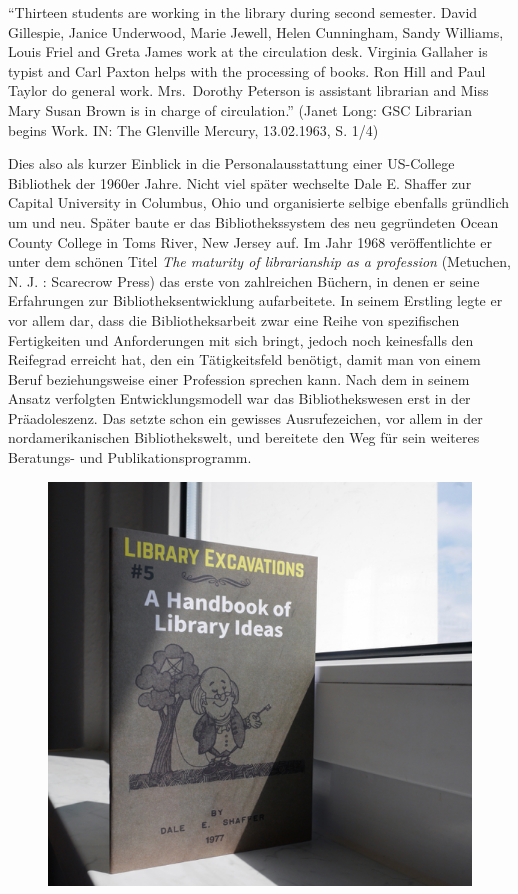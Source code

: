 \documentclass[a4paper,
fontsize=11pt,
oneside,
numbers=noperiodatend,
parskip=half-,
bibliography=totoc,
final
]{scrartcl}
\begin{document}
\enquote{Thirteen students are working in the library during second
semester. David Gillespie, Janice Underwood, Marie Jewell, Helen
Cunningham, Sandy Williams, Louis Friel and Greta James work at the
circulation desk. Virginia Gallaher is typist and Carl Paxton helps with
the processing of books. Ron Hill and Paul Taylor do general work.
Mrs.~Dorothy Peterson is assistant librarian and Miss Mary Susan Brown
is in charge of circulation.} (Janet Long: GSC Librarian begins Work.
IN: The Glenville Mercury, 13.02.1963, S. 1/4)

Dies also als kurzer Einblick in die Personalausstattung einer
US-College Bibliothek der 1960er Jahre. Nicht viel später wechselte Dale
E. Shaffer zur Capital University in Columbus, Ohio und organisierte
selbige ebenfalls gründlich um und neu. Später baute er das
Bibliothekssystem des neu gegründeten Ocean County College in Toms
River, New Jersey auf. Im Jahr 1968 veröffentlichte er unter dem schönen
Titel \emph{The maturity of librarianship as a profession} (Metuchen, N.
J. : Scarecrow Press) das erste von zahlreichen Büchern, in denen er
seine Erfahrungen zur Bibliotheksentwicklung aufarbeitete. In seinem
Erstling legte er vor allem dar, dass die Bibliotheksarbeit zwar eine
Reihe von spezifischen Fertigkeiten und Anforderungen mit sich bringt,
jedoch noch keinesfalls den Reifegrad erreicht hat, den ein
Tätigkeitsfeld benötigt, damit man von einem Beruf beziehungsweise einer
Profession sprechen kann. Nach dem in seinem Ansatz verfolgten
Entwicklungsmodell war das Bibliothekswesen erst in der Präadoleszenz.
Das setzte schon ein gewisses Ausrufezeichen, vor allem in der
nordamerikanischen Bibliothekswelt, und bereitete den Weg für sein
weiteres Beratungs- und Publikationsprogramm.

\begin{figure}
\centering
\includegraphics{lib_excavations.png}
\end{figure}
\end{document}

